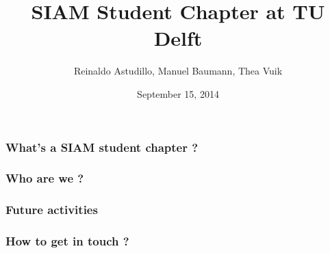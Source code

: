 \documentclass{beamer}
\title{\huge{SIAM Student Chapter at TU Delft}}
\author{Reinaldo Astudillo, Manuel Baumann, Thea Vuik}
\date{\footnotesize{September 15, 2014}}
\begin{document}
\frame{\titlepage}
\begin{frame}
\frametitle{What's a SIAM student chapter ?}

\end{frame}
\begin{frame}
\frametitle{Who are we ?}

\end{frame}

\begin{frame}
\frametitle{Future activities}

\end{frame}

\begin{frame}
\frametitle{How to get in touch ?}
\end{frame}
\end{document}
